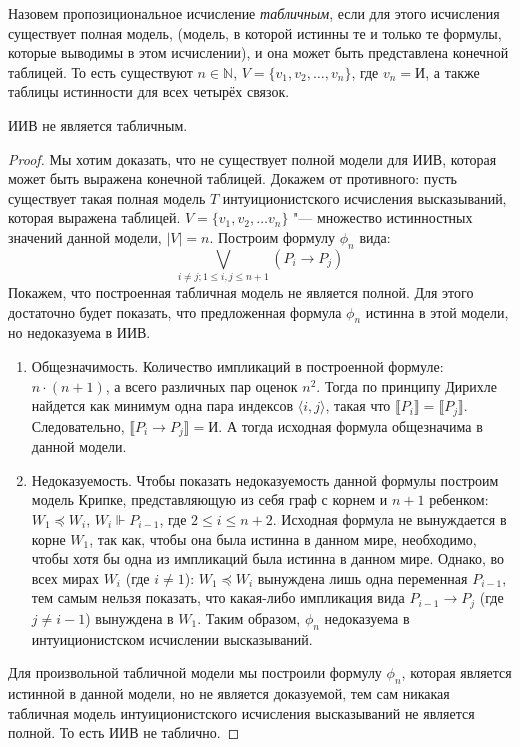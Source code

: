 \begin{definition}Назовем пропозициональное исчисление \emph{табличным}, если для этого исчисления 
существует полная модель, (модель, в которой истинны те и только те формулы, которые выводимы 
в этом исчислении), и она может быть представлена конечной таблицей. То есть существуют $n \in \mathbb{N}$,
$V = \{v_1, v_2, \dots, v_n\}$, где $v_n = \texttt{И}$, а также таблицы истинности для всех четырёх связок.
\end{definition}

\begin{theorem}
ИИВ не является табличным.
\end{theorem}
\begin{proof}
Мы хотим доказать, что не существует полной модели для ИИВ, которая может быть выражена конечной таблицей. 
Докажем от противного: пусть существует такая полная модель $T$ интуиционистского исчисления высказываний, которая выражена таблицей. 
$V = \{v_1, v_2, \dots v_n\}$ "--- множество истинностных значений данной модели, $|V| = n$.
Построим формулу $\phi_n$ вида: 
$$\bigvee_{i \ne j; 1 \leq i,j \leq n + 1} (P_i \to P_j)$$
Покажем, что построенная табличная модель не является полной. Для этого
достаточно будет показать, что предложенная формула $\phi_n$ истинна в этой модели, но недоказуема в ИИВ.
\begin{enumerate}
\item Общезначимость. Количество импликаций в построенной формуле: $n\cdot(n + 1)$, а всего различных 
пар оценок $n^2$. Тогда по принципу Дирихле найдется как минимум одна пара индексов  
$\langle i , j\rangle$, такая что  $\llbracket P_i \rrbracket = \llbracket P_j \rrbracket $.
Следовательно, $\llbracket P_i  \rightarrow  P_j \rrbracket = \texttt{И}$.
А тогда исходная формула общезначима в данной модели.
\item Недоказуемость. Чтобы показать недоказуемость данной формулы построим модель Крипке, представляющую
из себя граф с корнем и $n + 1$ ребенком: $W_1 \preceq W_i$,  $W_i \Vdash P_{i-1}$, где $2 \leq i \leq n + 2 $.
Исходная формула не вынуждается в корне $W_1$, так как, чтобы она была истинна в данном мире, необходимо, чтобы 
хотя бы одна из импликаций была истинна в данном мире. Однако, во всех мирах $W_i$ (где $ i \ne 1$): $W_1 \preceq W_i$ вынуждена
лишь одна переменная $P_{i-1}$, тем самым нельзя показать, что какая-либо импликация вида $P_{i-1} \rightarrow P_j$ (где $j \ne i - 1$)  
вынуждена в $W_1$. Таким образом, $\phi_n$ недоказуема в интуиционистском исчислении высказываний.
\end{enumerate}
 Для произвольной табличной модели мы построили формулу $\phi_n$, которая является истинной в данной модели, но не является доказуемой, тем сам никакая табличная модель интуиционистского исчисления высказываний не является полной. То есть ИИВ не таблично.
\end{proof}